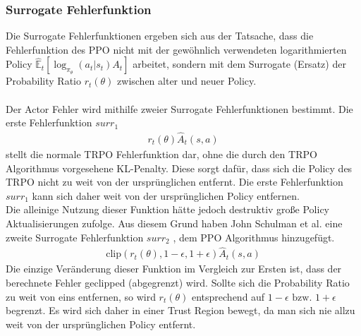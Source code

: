 \subsubsection{Surrogate Fehlerfunktion} \label{subsubsec:Grundlagen_Surrogate_Fehlerfunktion}
Die Surrogate Fehlerfunktionen ergeben sich aus der Tatsache, dass die Fehlerfunktion des PPO nicht mit der gewöhnlich verwendeten logarithmierten Policy $\mathbb{\hat{E}}_t[\log_{\pi_{\theta}}(a_t|s_t)A_t]$ arbeitet, sondern mit dem Surrogate (Ersatz) der Probability Ratio $r_{t}(\theta)$  zwischen alter und neuer Policy. \citep{TRPO}\\
\\Der Actor Fehler wird mithilfe zweier Surrogate Fehlerfunktionen bestimmt. Die erste Fehlerfunktion $surr_1$ 
\begin{align}
	r_{t}(\theta) \hat{A}_{t}(s, a)
	\label{eq:Grundlagen_surrogate_1}
\end{align}
stellt die normale TRPO \cite{TRPO} Fehlerfunktion dar, ohne die durch den TRPO Algorithmus vorgesehene KL-Penalty. Diese sorgt dafür, dass sich die Policy des TRPO nicht zu weit von der ursprünglichen entfernt. Die erste Fehlerfunktion $surr_1$ kann sich daher weit von der ursprünglichen Policy entfernen.\citep[S. 3 f.]{PPO}\\
Die alleinige Nutzung dieser Funktion hätte jedoch destruktiv große Policy Aktualisierungen zufolge. Aus diesem Grund haben John Schulman et al. eine zweite Surrogate Fehlerfunktion $surr_2$ , dem PPO Algorithmus hinzugefügt. 
\begin{align}
	\label{eq:Grundlagen_surrogate_2}
	\text{clip}(r_{t}(\theta), 1 - \epsilon, 1 + \epsilon) \hat{A}_{t}(s, a)
\end{align}
Die einzige Veränderung dieser Funktion im Vergleich zur Ersten ist, dass der berechnete Fehler geclipped (abgegrenzt) wird. Sollte sich die Probability Ratio zu weit von eins entfernen, so wird $r_{t}(\theta)$ entsprechend auf $1 - \epsilon \text{ bzw. } 1 + \epsilon$ begrenzt. Es wird sich daher in einer Trust Region bewegt, da man sich nie allzu weit von der ursprünglichen Policy entfernt. \citep{TRPO, PPO}

